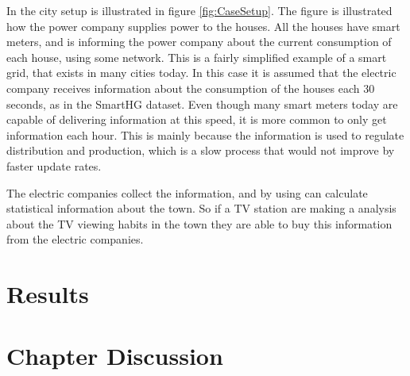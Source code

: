 In the city setup is illustrated in figure \ref{fig:CaseSetup}. The figure is illustrated how the power company supplies power to the houses. All the houses have smart meters, and is informing the power company about the current consumption of each house, using some network. This is a fairly simplified example of a smart grid, that exists in many cities today. In this case it is assumed that the electric company receives information about the consumption of the houses each 30 seconds, as in the SmartHG dataset. Even though many smart meters today are capable of delivering information at this speed, it is more common to only get information each hour. This is mainly because the information is used to regulate distribution and production, which is a slow process that would not improve by faster update rates.  

The electric companies collect the information, and by using  can calculate statistical information about the town. So if a TV station are making a analysis about the TV viewing habits in the town they are able to buy this information from the electric companies. 


\section{Results}





\section{Chapter Discussion}


